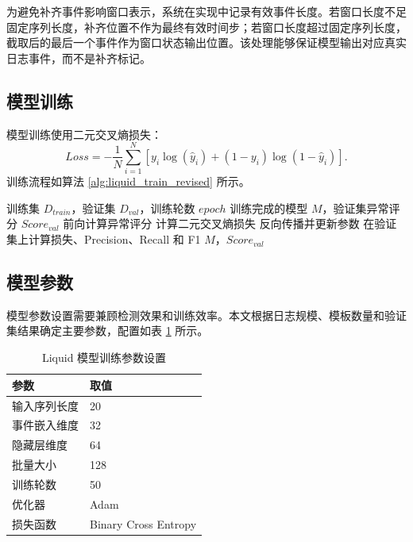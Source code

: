 为避免补齐事件影响窗口表示，系统在实现中记录有效事件长度。若窗口长度不足固定序列长度，补齐位置不作为最终有效时间步；若窗口长度超过固定序列长度，截取后的最后一个事件作为窗口状态输出位置。该处理能够保证模型输出对应真实日志事件，而不是补齐标记。

\subsection{模型训练}

模型训练使用二元交叉熵损失：
\begin{equation}
    Loss=-\frac{1}{N}\sum_{i=1}^{N}\left[y_i\log(\hat{y}_i)+(1-y_i)\log(1-\hat{y}_i)\right].
\end{equation}
训练流程如算法 \ref{alg:liquid_train_revised} 所示。

\begin{algorithm}[htbp]
    \caption{Liquid 异常检测模型训练流程}
    \label{alg:liquid_train_revised}
    \begin{algorithmic}[1]
        \REQUIRE 训练集 $D_{train}$，验证集 $D_{val}$，训练轮数 $epoch$
        \ENSURE 训练完成的模型 $M$，验证集异常评分 $Score_{val}$
                \STATE 前向计算异常评分
                \STATE 计算二元交叉熵损失
                \STATE 反向传播并更新参数
            \ENDFOR
            \STATE 在验证集上计算损失、Precision、Recall 和 F1
        \ENDFOR
        \RETURN $M$，$Score_{val}$
    \end{algorithmic}
\end{algorithm}

\subsection{模型参数}

模型参数设置需要兼顾检测效果和训练效率。本文根据日志规模、模板数量和验证集结果确定主要参数，配置如表 \ref{tab:liquid_model_parameters_revised} 所示。

\begin{table}[htbp]
    \centering
    \caption{Liquid 模型训练参数设置}
    \label{tab:liquid_model_parameters_revised}
    \begin{tabular}{p{5cm}p{6cm}}
        \hline
        \textbf{参数} & \textbf{取值} \\
        \hline
        输入序列长度 & 20 \\
        事件嵌入维度 & 32 \\
        隐藏层维度 & 64 \\
        批量大小 & 128 \\
        训练轮数 & 50 \\
        优化器 & Adam \\
        损失函数 & Binary Cross Entropy \\
        \hline
    \end{tabular}
\end{table}

